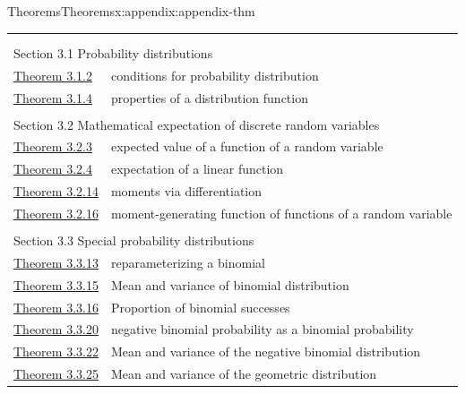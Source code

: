 \documentclass[oneside,10pt,]{book}
\numberwithin{equation}{section}
\begin{document}
\begin{appendixptx}{Theorems}{}{Theorems}{}{}{x:appendix:appendix-thm}
\noindent
\begin{longtable}[l]{ll}
\addtocounter{table}{-1}
\endfirsthead
\endhead
\multicolumn{2}{r}{(Continued on next page)}\\
\endfoot
\endlastfoot
\multicolumn{2}{l}{\null}\\[1.5ex] \multicolumn{2}{l}{\large Section 3.1 Probability distributions}\\[0.5ex]
\hyperref[x:theorem:thm-conditions-3-1]{Theorem 3.1.2}& conditions for probability distribution\\
\hyperref[x:theorem:thm-3-2]{Theorem 3.1.4}& properties of a distribution function\\
\multicolumn{2}{l}{\null}\\[1.5ex] \multicolumn{2}{l}{\large Section 3.2 Mathematical expectation of discrete random variables}\\[0.5ex]
\hyperref[x:theorem:thm-expected-value-function-random-variable-4-1]{Theorem 3.2.3}& expected value of a function of a random variable\\
\hyperref[x:theorem:thm-4-2]{Theorem 3.2.4}& expectation of a linear function\\
\hyperref[x:theorem:thm-4-9]{Theorem 3.2.14}& moments via differentiation\\
\hyperref[x:theorem:thm-4-10]{Theorem 3.2.16}& moment-generating function of functions of a random variable\\
\multicolumn{2}{l}{\null}\\[1.5ex] \multicolumn{2}{l}{\large Section 3.3 Special probability distributions}\\[0.5ex]
\hyperref[x:theorem:thm-bin-param]{Theorem 3.3.13}& reparameterizing a binomial\\
\hyperref[x:theorem:thm-bin-mean-var]{Theorem 3.3.15}& Mean and variance of binomial distribution\\
\hyperref[x:theorem:thm-bin-successes]{Theorem 3.3.16}& Proportion of binomial successes\\
\hyperref[x:theorem:thm-bin-negbin]{Theorem 3.3.20}& negative binomial probability as a binomial probability\\
\hyperref[g:theorem:idp140361459544288]{Theorem 3.3.22}& Mean and variance of the negative binomial distribution\\
\hyperref[g:theorem:idp140361459555536]{Theorem 3.3.25}& Mean and variance of the geometric distribution\\

\end{longtable}
\end{appendixptx}
\end{document}
